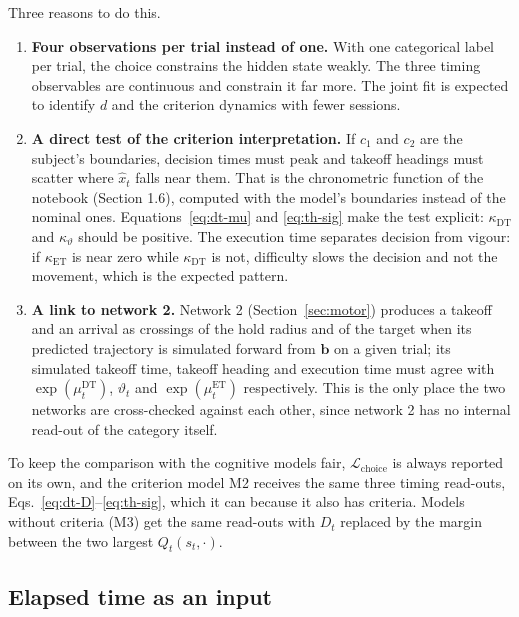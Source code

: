 \documentclass[11pt,a4paper]{article}
\newcommand{\vect}[1]{\bm{#1}}
\begin{document}
Three reasons to do this.

\begin{enumerate}[leftmargin=*]
\item \textbf{Four observations per trial instead of one.} With one categorical label
      per trial, the choice constrains the hidden state weakly. The three timing
      observables are continuous and constrain it far more. The joint fit is expected
      to identify $d$ and the criterion dynamics with fewer sessions.
\item \textbf{A direct test of the criterion interpretation.} If $c_1$ and $c_2$ are
      the subject's boundaries, decision times must peak and takeoff headings must
      scatter where $\hat{x}_t$ falls near them. That is the chronometric function of
      the notebook (Section 1.6), computed with the model's boundaries instead of the
      nominal ones. Equations~\eqref{eq:dt-mu} and \eqref{eq:th-sig} make the test
      explicit: $\kappa_{\mathrm{DT}}$ and $\kappa_{\vartheta}$ should be positive. The
      execution time separates decision from vigour: if $\kappa_{\mathrm{ET}}$ is near
      zero while $\kappa_{\mathrm{DT}}$ is not, difficulty slows the decision and not the
      movement, which is the expected pattern.
\item \textbf{A link to network 2.} Network 2 (Section~\ref{sec:motor}) produces a
      takeoff and an arrival as crossings of the hold radius and of the target when its
      predicted trajectory is simulated forward from $\vect{b}$ on a given trial; its
      simulated takeoff time, takeoff heading and execution time must agree with
      $\exp(\mu^{\mathrm{DT}}_t)$, $\vartheta_t$ and $\exp(\mu^{\mathrm{ET}}_t)$
      respectively. This is the only place the two networks are cross-checked against
      each other, since network 2 has no internal read-out of the category itself.
\end{enumerate}

To keep the comparison with the cognitive models fair, $\mathcal{L}_{\mathrm{choice}}$
is always reported on its own, and the criterion model M2 receives the same three
timing read-outs, Eqs.~\eqref{eq:dt-D}--\eqref{eq:th-sig}, which it can because it also
has criteria. Models without criteria (M3) get the same read-outs with $D_t$ replaced by
the margin between the two largest $Q_t(s_t, \cdot)$.

\subsection{Elapsed time as an input}
\end{document}
